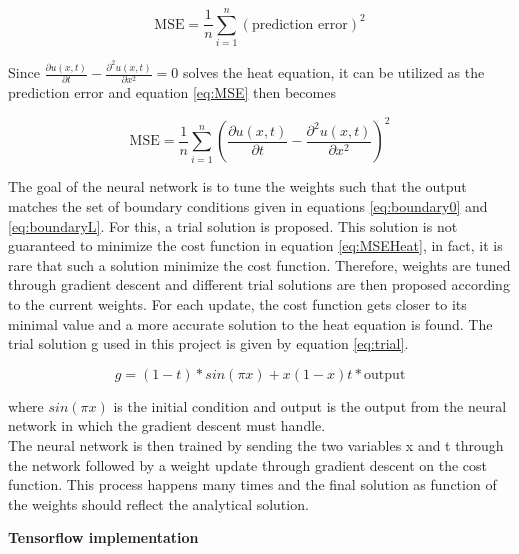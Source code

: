 \documentclass[12pt,a4paper]{article}
\begin{document}
\begin{equation}\label{eq:MSE}
\textrm{MSE} = \frac{1}{n} \sum_{i = 1}^n (\textrm{prediction error})^2
\end{equation}

\noindent Since $\frac{\partial u(x,t)}{\partial t} - \frac{\partial^2 u(x,t)}{\partial x^2} = 0$ solves the heat equation, it can be utilized as the prediction error and equation \ref{eq:MSE} then becomes

\begin{equation}\label{eq:MSEHeat}
\textrm{MSE} = \frac{1}{n} \sum_{i = 1}^n (\frac{\partial u(x,t)}{\partial t} - \frac{\partial^2 u(x,t)}{\partial x^2})^2
\end{equation}

\noindent The goal of the neural network is to tune the weights such that the output matches the set of boundary conditions given in equations \ref{eq:boundary0} and \ref{eq:boundaryL}. For this, a trial solution is proposed. This solution is not guaranteed to minimize the cost function in equation \ref{eq:MSEHeat}, in fact, it is rare that such a solution minimize the cost function. Therefore, weights are tuned through gradient descent and different trial solutions are then proposed according to the current weights. For each update, the cost function gets closer to its minimal value and a more accurate solution to the heat equation is found. The trial solution g used in this project is given by equation \ref{eq:trial}.

\begin{equation}\label{eq:trial}
g = (1-t)*sin(\pi x) + x(1-x)t*\textrm{output}
\end{equation}

\noindent where $sin(\pi x)$ is the initial condition and output is the output from the neural network in which the gradient descent must handle. 
\\
The neural network is then trained by sending the two variables x and t through the network followed by a weight update through gradient descent on the cost function. This process happens many times and the final solution as function of the weights should reflect the analytical solution.

\begin{center}
\large{\textbf{Tensorflow implementation}}
\end{center}
\end{document}
